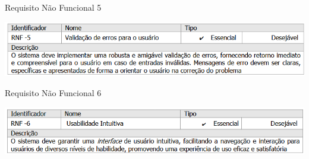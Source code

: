 \begin{table}[H]
    \caption{Requisito Não Funcional 5}\label{tab:rnf5}
    \centering
    \includegraphics[scale=0.82]{imagens/rnf5.png}
\end{table}
\begin{table}[H]
    \caption{Requisito Não Funcional 6}\label{tab:rnf6}
    \centering
    \includegraphics[scale=0.82]{imagens/rnf6.png}
\end{table}




